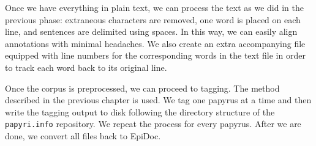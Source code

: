 Once we have everything in plain text, we can process the text as we
did in the previous phase: extraneous characters are removed, one word
is placed on each line, and sentences are delimited using spaces. In
this way, we can easily align annotations with minimal headaches. We
also create an extra accompanying file equipped with line numbers for
the corresponding words in the text file in order to track each word
back to its original line.

Once the corpus is preprocessed, we can proceed to tagging. The method
described in the previous chapter is used. We tag one papyrus at a
time and then write the tagging output to disk following the directory
structure of the \texttt{papyri.info} repository. We repeat the process
for every papyrus. After we are done, we convert all files back to
EpiDoc.
